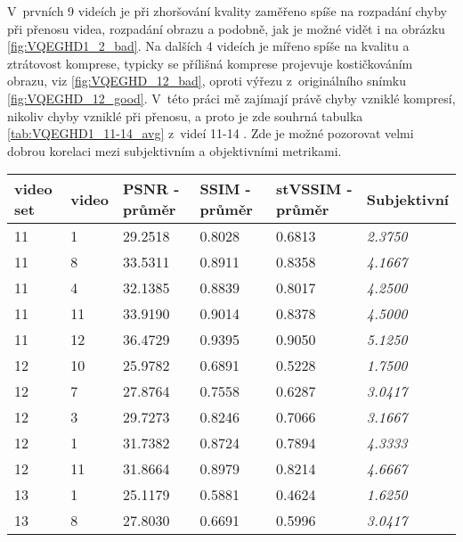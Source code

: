 \documentclass[thesis=M,czech]{FITthesis}[2016/06/26]
\begin{document}
V~prvních 9 videích je při zhoršování kvality zaměřeno spíše na rozpadání chyby při přenosu videa, rozpadání obrazu a podobně, jak je možné vidět i na obrázku \ref{fig:VQEGHD1_2_bad}. Na dalších 4 videích je mířeno spíše na kvalitu a ztrátovost komprese, typicky se přílišná komprese projevuje kostičkováním obrazu, viz \ref{fig:VQEGHD_12_bad}, oproti výřezu z~originálního snímku \ref{fig:VQEGHD_12_good}. V~této práci mě zajímají právě chyby vzniklé kompresí, nikoliv chyby vzniklé při přenosu, a proto je zde souhrná tabulka \ref{tab:VQEGHD1_11-14_avg} z~videí 11-14 . Zde je možné pozorovat velmi dobrou korelaci mezi subjektivním a objektivními metrikami. 

\begin{table}[]
\centering
\begin{tabular}{|p{1cm}|p{1cm}|p{1.3cm}|p{1.3cm}|p{1.5cm}|p{1.8cm}|}
\hline
video set & video & PSNR - průměr & SSIM - průměr & stVSSIM - průměr & Subjektivní \\ \hline
11        & 1     & 29.2518       & 0.8028        & 0.6813           &  \textit{2.3750}      \\ \hline
11        & 8     & 33.5311       & 0.8911        & 0.8358           &  \textit{4.1667}      \\ \hline
11        & 4     & 32.1385       & 0.8839        & 0.8017           &  \textit{4.2500}      \\ \hline
11        & 11    & 33.9190       & 0.9014        & 0.8378           &  \textit{4.5000}      \\ \hline
11        & 12    & 36.4729       & 0.9395        & 0.9050           &  \textit{5.1250}      \\ \hline
12        & 10    & 25.9782       & 0.6891        & 0.5228           &  \textit{1.7500}      \\ \hline
12        & 7     & 27.8764       & 0.7558        & 0.6287           &  \textit{3.0417}      \\ \hline
12        & 3     & 29.7273       & 0.8246        & 0.7066           &  \textit{3.1667}      \\ \hline
12        & 1     & 31.7382       & 0.8724        & 0.7894           &  \textit{4.3333}      \\ \hline
12        & 11    & 31.8664       & 0.8979        & 0.8214           &  \textit{4.6667}      \\ \hline
13        & 1     & 25.1179       & 0.5881        & 0.4624           &  \textit{1.6250}      \\ \hline
13        & 8     & 27.8030       & 0.6691        & 0.5996           &  \textit{3.0417}      \\ \hline

\end{tabular}
\end{table}
\end{document}
